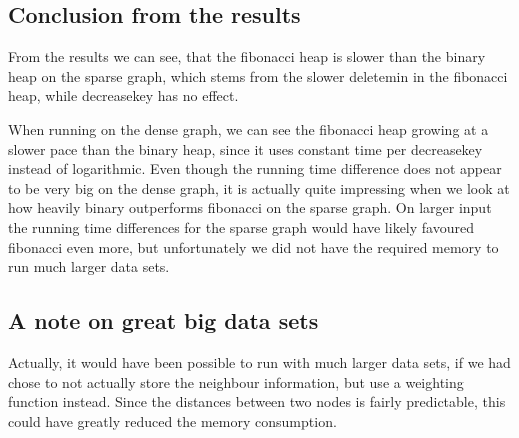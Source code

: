 \subsection{Conclusion from the results}

From the results we can see, that the fibonacci heap is slower than the binary heap on the sparse graph, which stems from the slower deletemin in the fibonacci heap, while decreasekey has no effect.

When running on the dense graph, we can see the fibonacci heap growing at a slower pace than the binary heap, since it uses constant time per decreasekey instead of logarithmic.
Even though the running time difference does not appear to be very big on the dense graph, it is actually quite impressing when we look at how heavily binary outperforms fibonacci on the sparse graph. On larger input the running time differences for the sparse graph would have likely favoured fibonacci even more, but unfortunately we did not have the required memory to run much larger data sets.

\subsection{A note on great big data sets}

Actually, it would have been possible to run with much larger data sets, if we had chose to not actually store the neighbour information, but use a weighting function instead. Since the distances between two nodes is fairly predictable, this could have greatly reduced the memory consumption. 